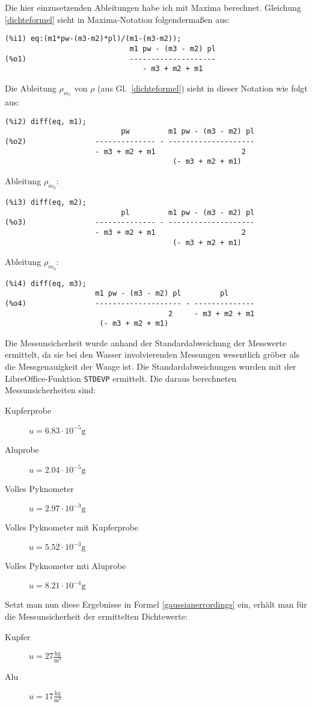 \documentclass[12pt,a4paper,notitlepage]{article}
\begin{document}
Die hier einzusetzenden Ableitungen habe ich mit Maxima berechnet. Gleichung \ref{dichteformel} sieht in Maxima-Notation folgendermaßen aus:
\begin{verbatim}
(%i1) eq:(m1*pw-(m3-m2)*pl)/(m1-(m3-m2));
                             m1 pw - (m3 - m2) pl
(%o1)                        --------------------
                                - m3 + m2 + m1
\end{verbatim}
Die Ableitung $\rho_{m_1}$ von $\rho$ (aus Gl.\ \ref{dichteformel}) sieht in dieser Notation wie folgt aus:
\begin{verbatim}
(%i2) diff(eq, m1);
                           pw         m1 pw - (m3 - m2) pl
(%o2)                -------------- - --------------------
                     - m3 + m2 + m1                    2
                                       (- m3 + m2 + m1)
\end{verbatim}
Ableitung $\rho_{m_2}$: 
\begin{verbatim}
(%i3) diff(eq, m2);
                           pl         m1 pw - (m3 - m2) pl
(%o3)                -------------- - --------------------
                     - m3 + m2 + m1                    2
                                       (- m3 + m2 + m1)
\end{verbatim}
Ableitung $\rho_{m_3}$:
\begin{verbatim}
(%i4) diff(eq, m3);
                     m1 pw - (m3 - m2) pl         pl
(%o4)                -------------------- - --------------
                                      2     - m3 + m2 + m1
                      (- m3 + m2 + m1)
\end{verbatim}
Die Messunsicherheit wurde anhand der Standardabweichung der Messwerte ermittelt, da sie bei den Wasser involvierenden Messungen wesentlich gröber als die Messgenauigkeit der Waage ist. Die Standardabweichungen wurden mit der LibreOffice-Funktion \texttt{STDEVP} ermittelt. Die daraus berechneten Messunsicherheiten sind:
\begin{description}
\item[Kupferprobe]$u=6.83\cdot10^{-5}\mathrm{g}$
\item[Aluprobe]$u=2.04\cdot10^{-5}\mathrm{g}$
\item[Volles Pyknometer]$u=2.97\cdot10^{-3}\mathrm{g}$
\item[Volles Pyknometer mit Kupferprobe]$u=5.52\cdot10^{-3}\mathrm{g}$
\item[Volles Pyknometer mti Aluprobe]$u=8.21\cdot10^{-4}\mathrm{g}$
\end{description}
Setzt man nun diese Ergebnisse in Formel \ref{gaussianerrordings} ein, erhält man für die Messunsicherheit der ermittelten Dichtewerte:
\begin{description}
\item[Kupfer]$u=27\frac{\mathrm{kg}}{\mathrm{m}^3}$
\item[Alu]$u=17\frac{\mathrm{kg}}{\mathrm{m}^3}$
\end{description}
\end{document}
